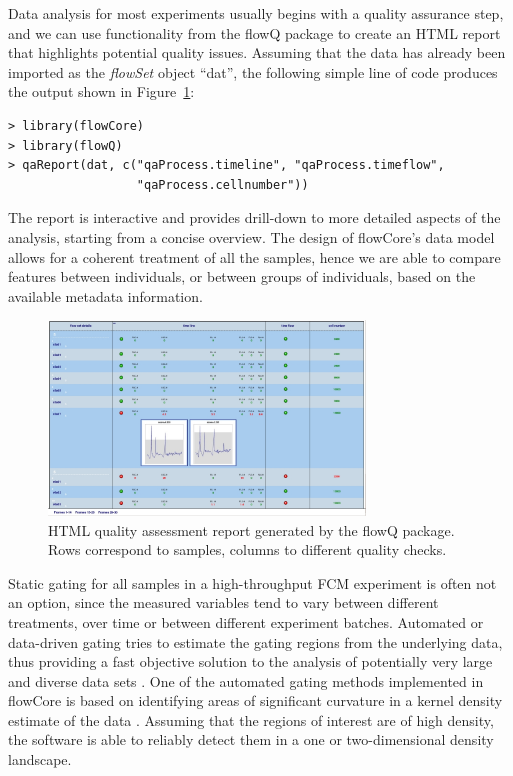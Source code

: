 \documentclass[12pt]{article}
\newcommand{\Rpackage}[1]{{\textsf{#1}}}
\newcommand{\Rclass}[1]{{\textit{#1}}}
\begin{document}
Data analysis for most experiments usually begins with a quality
assurance step, and we can use functionality from the \Rpackage{flowQ}
package to create an HTML report that highlights potential quality
issues. Assuming that the data has already been imported as the
\Rclass{flowSet} object ``dat'', the following simple line of code
produces the output shown in Figure~\ref{flowQ}:

\begin{verbatim}
> library(flowCore)
> library(flowQ)
> qaReport(dat, c("qaProcess.timeline", "qaProcess.timeflow", 
                  "qaProcess.cellnumber"))
\end{verbatim}

The report is interactive and provides drill-down to more detailed
aspects of the analysis, starting from a concise overview. The design of \Rpackage{flowCore}'s data model
allows for a coherent treatment of all the samples, hence we are able
to compare features between individuals, or between groups of
individuals, based on the available metadata information.


\begin{figure}[htbp]
\centering
\includegraphics[width=0.75\textwidth]{flowQ.jpg}
\caption{\label{flowQ}%
  HTML quality assessment report generated by the flowQ package. Rows
  correspond to samples, columns to different quality checks.}
\end{figure}

Static gating for all samples in a high-throughput FCM experiment is
often not an option, since the measured variables tend to vary between
different treatments, over time or between different experiment
batches. Automated or data-driven gating tries to estimate the gating
regions from the underlying data, thus providing a fast objective
solution to the analysis of potentially very large and diverse data
sets \cite{lo2008agf}. One of the automated gating methods implemented
in \Rpackage{flowCore} is based on identifying areas of significant
curvature in a kernel density estimate of the data
\citep{wand2008}. Assuming that the regions of interest are of high
density, the software is able to reliably detect them in a one or
two-dimensional density landscape.
\end{document}
